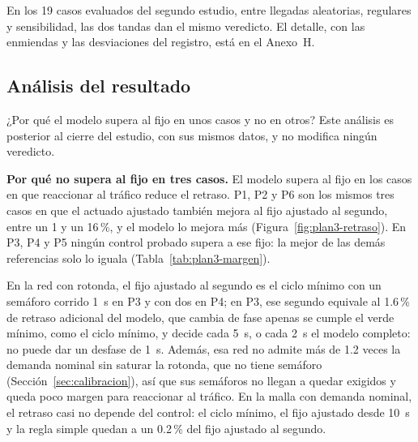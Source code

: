 En los 19 casos evaluados del segundo estudio, entre llegadas
aleatorias, regulares y sensibilidad, las dos tandas dan el mismo
veredicto. El detalle, con las enmiendas y las desviaciones del
registro, está en el Anexo~H.

\subsection{Análisis del resultado}
\label{sec:donde-gana}
¿Por qué el modelo supera al fijo en unos casos y no en otros? Este
análisis es posterior al cierre del estudio, con sus mismos datos, y no
modifica ningún veredicto.

\noindent\textbf{Por qué no supera al fijo en tres casos.} El modelo
supera al fijo en los casos en que reaccionar al tráfico reduce el
retraso. P1, P2 y P6 son los mismos tres casos en que el actuado
ajustado también mejora al fijo ajustado al segundo, entre un 1 y un
16\,\%, y el modelo lo mejora más (Figura~\ref{fig:plan3-retraso}). En
P3, P4 y P5 ningún control probado supera a ese fijo: la mejor de las
demás referencias solo lo iguala (Tabla~\ref{tab:plan3-margen}).

En la red con rotonda, el fijo ajustado al segundo es el ciclo mínimo
con un semáforo corrido 1~s en P3 y con dos en P4; en P3, ese segundo
equivale al 1.6\,\% de retraso adicional del modelo, que cambia de fase
apenas se cumple el verde mínimo, como el ciclo mínimo, y decide cada
5~s, o cada 2~s el modelo completo: no puede dar un desfase de 1~s.
Además, esa red no admite más de 1.2 veces la demanda nominal sin
saturar la rotonda, que no tiene semáforo (Sección~\ref{sec:calibracion}),
así que sus semáforos no llegan a quedar exigidos y queda poco margen
para reaccionar al tráfico. En la malla con demanda nominal, el retraso
casi no depende del control: el ciclo mínimo, el fijo ajustado desde
10~s y la regla simple quedan a un 0.2\,\% del fijo ajustado al segundo.

